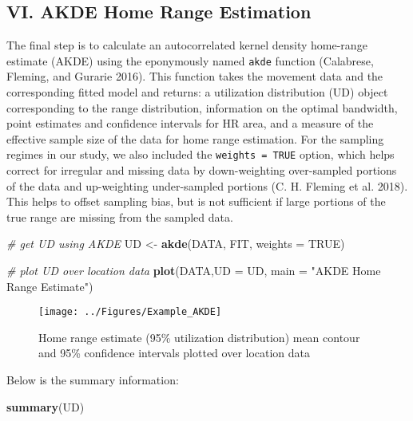\documentclass[
]{article}
\newenvironment{Shaded}{\begin{snugshade}}{\end{snugshade}}
\newcommand{\AttributeTok}[1]{\textcolor[rgb]{0.13,0.29,0.53}{#1}}
\newcommand{\CommentTok}[1]{\textcolor[rgb]{0.56,0.35,0.01}{\textit{#1}}}
\newcommand{\ConstantTok}[1]{\textcolor[rgb]{0.56,0.35,0.01}{#1}}
\newcommand{\FunctionTok}[1]{\textcolor[rgb]{0.13,0.29,0.53}{\textbf{#1}}}
\newcommand{\NormalTok}[1]{#1}
\newcommand{\OtherTok}[1]{\textcolor[rgb]{0.56,0.35,0.01}{#1}}
\newcommand{\StringTok}[1]{\textcolor[rgb]{0.31,0.60,0.02}{#1}}
\begin{document}
\subsection{VI. AKDE Home Range
Estimation}\label{vi.-akde-home-range-estimation}

The final step is to calculate an autocorrelated kernel density
home-range estimate (AKDE) using the eponymously named \texttt{akde}
function (Calabrese, Fleming, and Gurarie 2016). This function takes the
movement data and the corresponding fitted model and returns: a
utilization distribution (UD) object corresponding to the range
distribution, information on the optimal bandwidth, point estimates and
confidence intervals for HR area, and a measure of the effective sample
size of the data for home range estimation. For the sampling regimes in
our study, we also included the \texttt{weights\ =\ TRUE} option, which
helps correct for irregular and missing data by down-weighting
over-sampled portions of the data and up-weighting under-sampled
portions (C. H. Fleming et al. 2018). This helps to offset sampling
bias, but is not sufficient if large portions of the true range are
missing from the sampled data.

\begin{Shaded}
\begin{Highlighting}[]
\CommentTok{\# get UD using AKDE}
\NormalTok{UD }\OtherTok{\textless{}{-}} \FunctionTok{akde}\NormalTok{(DATA, FIT, }\AttributeTok{weights =} \ConstantTok{TRUE}\NormalTok{)}

\CommentTok{\# plot UD over location data}
\FunctionTok{plot}\NormalTok{(DATA,}\AttributeTok{UD =}\NormalTok{ UD, }\AttributeTok{main =} \StringTok{"AKDE Home Range Estimate"}\NormalTok{)}
\end{Highlighting}
\end{Shaded}

\begin{figure}[H]

{\centering \texttt{[image: ../Figures/Example\_AKDE]} 

}

\caption{Home range estimate (95\% utilization distribution) mean contour and 95\% confidence intervals plotted over location data}\label{fig:unnamed-chunk-24}
\end{figure}

Below is the summary information:

\begin{Shaded}
\begin{Highlighting}[]
\FunctionTok{summary}\NormalTok{(UD)}
\end{Highlighting}
\end{Shaded}
\end{document}

